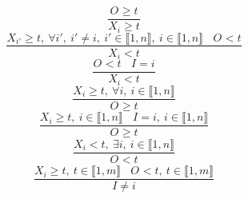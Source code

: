 $$\frac{O_{} \geq t}{X_{i} \geq t}$$ $$\frac{X_{i'} \geq t,~\forall i',~i' \neq i,~i' \in \llbracket1,n\rrbracket,~i \in \llbracket1,n\rrbracket~~~~O_{}<t}{X_{i}<t}$$ $$\frac{O_{}<t~~~~I=i}{X_{i}<t}$$ $$\frac{X_{i} \geq t,~\forall i,~i \in \llbracket1,n\rrbracket}{O_{} \geq t}$$ $$\frac{X_{i} \geq t,~i \in \llbracket1,n\rrbracket~~~~I=i,~i \in \llbracket1,n\rrbracket}{O_{} \geq t}$$ $$\frac{X_{i}<t,~\exists i,~i \in \llbracket1,n\rrbracket}{O_{}<t}$$ $$\frac{X_{i} \geq t,~t \in \llbracket1,m\rrbracket~~~~O_{}<t,~t \in \llbracket1,m\rrbracket}{I \neq i}$$ 
